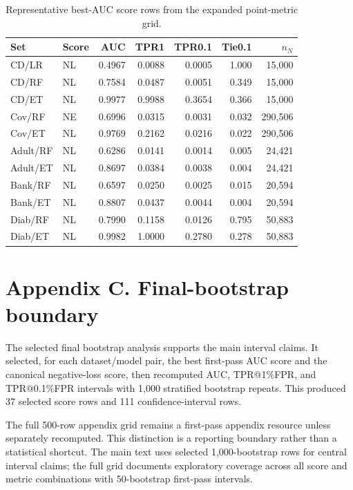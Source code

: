 \documentclass[
  10pt,
  twocolumn]{article}
\begin{document}
\begin{table}[H]
\centering
\scriptsize
\caption{Representative best-AUC score rows from the expanded point-metric grid.}
\label{tab:appendix-selected-point-rows}
\setlength{\tabcolsep}{2.5pt}
\begin{tabular}{@{}l l r r r r r@{}}
\toprule
Set & Score & AUC & TPR1 & TPR0.1 & Tie0.1 & $n_N$ \\
\midrule
CD/LR & NL & 0.4967 & 0.0088 & 0.0005 & 1.000 & 15,000 \\
CD/RF & NL & 0.7584 & 0.0487 & 0.0051 & 0.349 & 15,000 \\
CD/ET & NL & 0.9977 & 0.9988 & 0.3654 & 0.366 & 15,000 \\
Cov/RF & NE & 0.6996 & 0.0315 & 0.0031 & 0.032 & 290,506 \\
Cov/ET & NL & 0.9769 & 0.2162 & 0.0216 & 0.022 & 290,506 \\
Adult/RF & NL & 0.6286 & 0.0141 & 0.0014 & 0.005 & 24,421 \\
Adult/ET & NL & 0.8697 & 0.0384 & 0.0038 & 0.004 & 24,421 \\
Bank/RF & NL & 0.6597 & 0.0250 & 0.0025 & 0.015 & 20,594 \\
Bank/ET & NL & 0.8807 & 0.0437 & 0.0044 & 0.004 & 20,594 \\
Diab/RF & NL & 0.7990 & 0.1158 & 0.0126 & 0.795 & 50,883 \\
Diab/ET & NL & 0.9982 & 1.0000 & 0.2780 & 0.278 & 50,883 \\
\bottomrule
\end{tabular}
\end{table}

\hypertarget{appendix-c-final-bootstrap-boundary}{%
\section{Appendix C. Final-bootstrap boundary}\label{appendix-c-final-bootstrap-boundary}}

The selected final bootstrap analysis supports the main interval claims. It selected, for each dataset/model pair, the best first-pass AUC score and the canonical negative-loss score, then recomputed AUC, TPR@1\%FPR, and TPR@0.1\%FPR intervals with 1,000 stratified bootstrap repeats. This produced 37 selected score rows and 111 confidence-interval rows.

The full 500-row appendix grid remains a first-pass appendix resource unless separately recomputed. This distinction is a reporting boundary rather than a statistical shortcut. The main text uses selected 1,000-bootstrap rows for central interval claims; the full grid documents exploratory coverage across all score and metric combinations with 50-bootstrap first-pass intervals.
\end{document}
